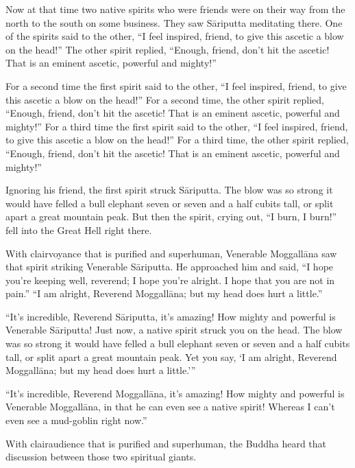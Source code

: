 \documentclass[12pt,openany]{book}%
\begin{document}
Now at that time two native spirits who were friends were on their way from the north to the south on some business. They saw \textsanskrit{Sāriputta} meditating there. One of the spirits said to the other, “I feel inspired, friend, to give this ascetic a blow on the head!” The other spirit replied, “Enough, friend, don’t hit the ascetic! That is an eminent ascetic, powerful and mighty!” 

For a second time the first spirit said to the other, “I feel inspired, friend, to give this ascetic a blow on the head!” For a second time, the other spirit replied, “Enough, friend, don’t hit the ascetic! That is an eminent ascetic, powerful and mighty!” For a third time the first spirit said to the other, “I feel inspired, friend, to give this ascetic a blow on the head!” For a third time, the other spirit replied, “Enough, friend, don’t hit the ascetic! That is an eminent ascetic, powerful and mighty!” 

Ignoring his friend, the first spirit struck \textsanskrit{Sāriputta}. The blow was so strong it would have felled a bull elephant seven or seven and a half cubits tall, or split apart a great mountain peak. But then the spirit, crying out, “I burn, I burn!” fell into the Great Hell right there. 

With clairvoyance that is purified and superhuman, Venerable \textsanskrit{Moggallāna} saw that spirit striking Venerable \textsanskrit{Sāriputta}. He approached him and said, “I hope you’re keeping well, reverend; I hope you’re alright. I hope that you are not in pain.” “I am alright, Reverend \textsanskrit{Moggallāna}; but my head does hurt a little.” 

“It’s incredible, Reverend \textsanskrit{Sāriputta}, it’s amazing! How mighty and powerful is Venerable \textsanskrit{Sāriputta}! Just now, a native spirit struck you on the head. The blow was so strong it would have felled a bull elephant seven or seven and a half cubits tall, or split apart a great mountain peak. Yet you say, ‘I am alright, Reverend \textsanskrit{Moggallāna}; but my head does hurt a little.’” 

“It’s incredible, Reverend \textsanskrit{Moggallāna}, it’s amazing! How mighty and powerful is Venerable \textsanskrit{Moggallāna}, in that he can even see a native spirit! Whereas I can’t even see a mud-goblin right now.” 

With clairaudience that is purified and superhuman, the Buddha heard that discussion between those two spiritual giants. 
\end{document}
